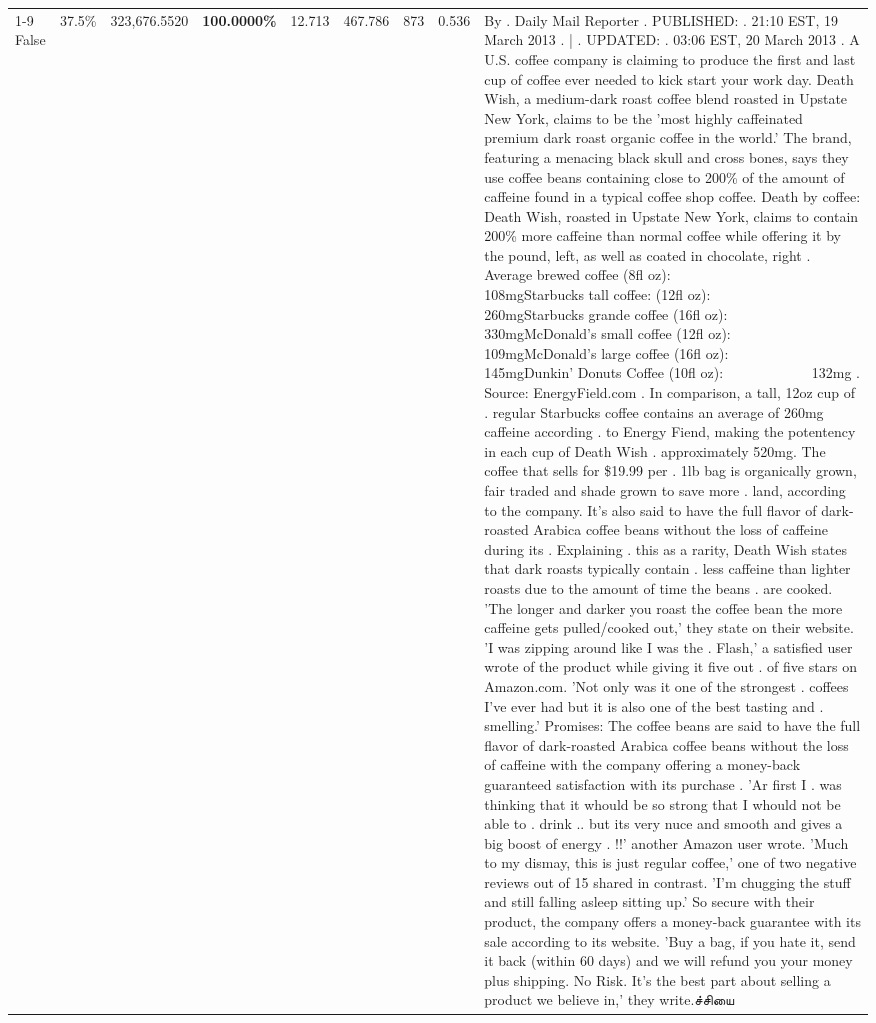 \begin{table}[H]
{\begin{tabular}{lllrlllll}
\cline{1-9}
False & 37.5\% & 323,676.5520 & \bfseries \color{red} 100.0000\% & 12.713 & 467.786 & 873 & 0.536 & By . Daily Mail Reporter . PUBLISHED: . 21:10 EST, 19 March 2013 . | . UPDATED: . 03:06 EST, 20 March 2013 . A U.S. coffee company is claiming to produce the first and last cup of coffee ever needed to kick start your work day. Death Wish, a medium-dark roast coffee blend roasted in Upstate New York, claims to be the 'most highly caffeinated premium dark roast organic coffee in the world.' The brand, featuring a menacing black skull and cross bones, says they use coffee beans containing close to 200\% of the amount of caffeine found in a typical coffee shop coffee. Death by coffee: Death Wish, roasted in Upstate New York, claims to contain 200\% more caffeine than normal coffee while offering it by the pound, left, as well as coated in chocolate, right . Average brewed coffee (8fl oz):              108mgStarbucks tall coffee: (12fl oz):                260mgStarbucks grande coffee (16fl oz):         330mgMcDonald's small coffee (12fl oz):           109mgMcDonald's large coffee (16fl oz):           145mgDunkin' Donuts Coffee (10fl oz):             132mg . Source: EnergyField.com . In comparison, a tall, 12oz cup of . regular Starbucks coffee contains an average of 260mg caffeine according . to Energy Fiend, making the potentency in each cup of Death Wish . approximately 520mg. The coffee that sells for \$19.99 per . 1lb bag is organically grown, fair traded and shade grown to save more . land, according to the company. It's also said to have the full flavor of dark-roasted Arabica coffee beans without the loss of caffeine during its . Explaining . this as a rarity, Death Wish states that dark roasts typically contain . less caffeine than lighter roasts due to the amount of time the beans . are cooked. 'The longer and darker you roast the coffee bean the more caffeine gets pulled/cooked out,' they state on their website. 'I was zipping around like I was the . Flash,' a satisfied user wrote of the product while giving it five out . of five stars on Amazon.com. 'Not only was it one of the strongest . coffees I've ever had but it is also one of the best tasting and . smelling.’ Promises: The coffee beans are said to have the full flavor of dark-roasted Arabica coffee beans without the loss of caffeine with the company offering a money-back guaranteed satisfaction with its purchase . 'Ar first I . was thinking that it whould be so strong that I whould not be able to . drink .. but its very nuce and smooth and gives a big boost of energy . !!' another Amazon user wrote. 'Much to my dismay, this is just regular coffee,' one of two negative reviews out of 15 shared in contrast. 'I'm chugging the stuff and still falling asleep sitting up.' So secure with their product, the company offers a money-back guarantee with its sale according to its website. 'Buy a bag, if you hate it, send it back (within 60 days) and we will refund you your money plus shipping. No Risk. It’s the best part about selling a product we believe in,' they write.ச்சியை \\

\end{tabular}}
\end{table}
